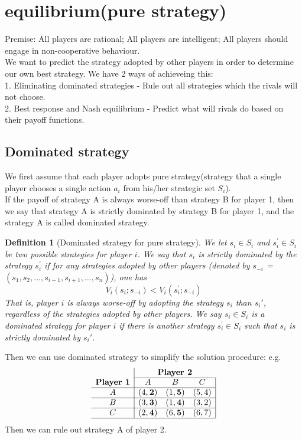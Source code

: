 \documentclass[twoside]{article}
\theoremstyle{definitionstyle}
\newtheorem*{definition}{Definition}
\begin{document}
\section{equilibrium(pure strategy)}
Premise: All players are rational; All players are intelligent; All players should engage in non-cooperative behaviour.\\
We want to predict the strategy adopted by other players in order to determine our own best strategy. We have 2 ways of achieveing this: \\
1. Eliminating dominated strategies - Rule out all strategies which the rivals will not choose. \\
2. Best response and Nash equilibrium - Predict what will rivals do based on their payoff functions. \\
%
%
%
%
%
\subsection{Dominated strategy}
We first assume that each player adopts pure strategy(strategy that a single player chooses a single action $a_i$ from his/her strategic set $S_i$).\\
If the payoff of strategy A is always worse-off than strategy B for player 1, then we say that strategy A is strictly dominated by strategy B for player 1, and the strategy A is called dominated strategy.\\
\begin{definition}[Dominated strategy for pure strategy]
   We let $s_i\in S_i$ and $s_i^\prime \in S_i$ be two possible strategies for player $i$. We say 
that $s_i$ is strictly dominated by the strategy $s_i^\prime$ if for any strategies adopted by other players (denoted by $s_{-i}$ =
$(s_1,s_2,\ldots, s_{i-1},s_{i+1},\ldots, s_n)$), one has 
$$V_i(s_i;s_{-i})<V_i(s_i^\prime;s_{-i})$$
That is, player $i$ is always worse-off by adopting the strategy $s_i$ than $s_i'$, regardless of the strategies adopted by other players. 
We say $s_i\in S_i$ is a dominated strategy for player $i$ if there is another 
strategy $s_i^\prime \in S_i$ such that $s_i$ is strictly dominated by $s_i'$. 
\end{definition}
Then we can use dominated strategy to simplify the solution procedure: e.g. 
\[
\begin{array}{c|ccc|}
 & \multicolumn{3}{c}{\textbf{Player 2}} \\
\cline{2-4}
\textbf{Player 1} & A & B & C \\
\hline
A & (4,\mathbf{2}) & (1,\mathbf{5}) & (5,4) \\
\hline
B & (3,\mathbf{3}) & (1,\mathbf{4}) & (3,2) \\
\hline
C & (2,\mathbf{4}) & (6,\mathbf{5}) & (6,7) \\
\hline
\end{array}
\]
Then we can rule out strategy A of player 2.
%
%
%
%
%
\end{document}

